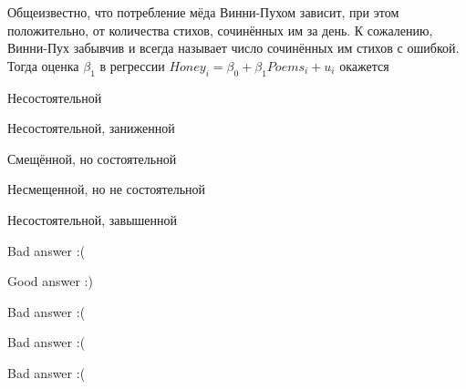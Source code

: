
\begin{question}
Общеизвестно, что потребление мёда Винни-Пухом зависит, при этом положительно, от количества стихов, сочинённых им за день.
К сожалению, Винни-Пух забывчив и всегда называет число сочинённых им стихов с ошибкой.
Тогда оценка \(\beta_1\) в регрессии \(Honey_i = \beta_0 + \beta_1 Poems_i + u_i\) окажется
\begin{answerlist}
  \item Несостоятельной
  \item Несостоятельной, заниженной
  \item Смещённой, но состоятельной
  \item Несмещенной, но не состоятельной
  \item Несостоятельной, завышенной
\end{answerlist}
\end{question}

\begin{solution}
\begin{answerlist}
  \item Bad answer :(
  \item Good answer :)
  \item Bad answer :(
  \item Bad answer :(
  \item Bad answer :(
\end{answerlist}
\end{solution}


